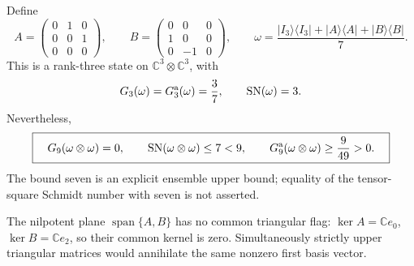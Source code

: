 \begin{theorem}
\label{thm:flat-roof-tensor-failure}
Define
\[
 A=\begin{pmatrix}0&1&0\\0&0&1\\0&0&0\end{pmatrix},\qquad
 B=\begin{pmatrix}0&0&0\\1&0&0\\0&-1&0\end{pmatrix},\qquad
 \omega=\frac{|I_3\rangle\langle I_3|
                 +|A\rangle\langle A|+|B\rangle\langle B|}{7}.
\]
This is a rank-three state on $\mathbb C^3\otimes\mathbb C^3$, with
\[
 G_3(\omega)=G_3^{\rm a}(\omega)=\frac37,
       \qquad \operatorname{SN}(\omega)=3.
\]
Nevertheless,
\[
 \boxed{\quad G_9(\omega\otimes\omega)=0,\qquad
          \operatorname{SN}(\omega\otimes\omega)\le7<9,\qquad
          G_9^{\rm a}(\omega\otimes\omega)\ge\frac9{49}>0.\quad}
\]
The bound seven is an explicit ensemble upper bound; equality of the
tensor-square Schmidt number with seven is not asserted.
\end{theorem}
The nilpotent plane $\operatorname{span}\{A,B\}$ has no common triangular
flag: $\ker A=\mathbb Ce_0$, $\ker B=\mathbb Ce_2$, so their common
kernel is zero. Simultaneously strictly upper triangular matrices would
annihilate the same nonzero first basis vector.

